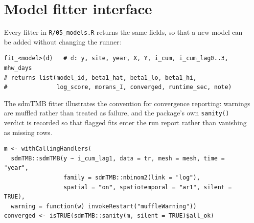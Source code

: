 \documentclass[11pt,a4paper]{article}
\begin{document}
\section{Model fitter interface}
Every fitter in \texttt{R/05\_models.R} returns the same fields, so that a new model can be added without changing the runner:
\begin{lstlisting}
fit_<model>(d)   # d: y, site, year, X, Y, i_cum, i_cum_lag0..3, mhw_days
# returns list(model_id, beta1_hat, beta1_lo, beta1_hi,
#              log_score, morans_I, converged, runtime_sec, note)
\end{lstlisting}
The sdmTMB fitter illustrates the convention for convergence reporting: warnings are muffled rather than treated as failure, and the package's own \texttt{sanity()} verdict is recorded so that flagged fits enter the run report rather than vanishing as missing rows.
\begin{lstlisting}
m <- withCallingHandlers(
  sdmTMB::sdmTMB(y ~ i_cum_lag1, data = tr, mesh = mesh, time = "year",
                 family = sdmTMB::nbinom2(link = "log"),
                 spatial = "on", spatiotemporal = "ar1", silent = TRUE),
  warning = function(w) invokeRestart("muffleWarning"))
converged <- isTRUE(sdmTMB::sanity(m, silent = TRUE)$all_ok)
\end{lstlisting}


\end{document}
